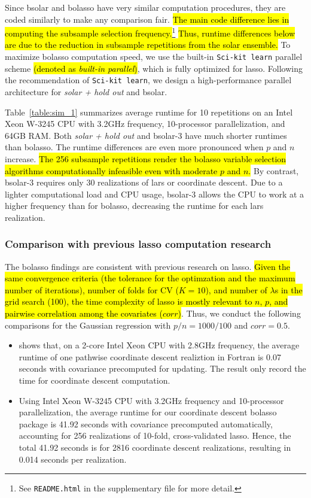\documentclass[11pt,review,authoryear]{elsarticle}
\begin{document}
Since bsolar and bolasso have very similar computation procedures, they are coded similarly to make any comparison fair. \hl{The main code difference lies in computing the subsample selection frequency.}\footnote{See \texttt{README.html} in the supplementary file for more detail.} \hl{Thus, runtime differences below are due to the reduction in subsample repetitions from the solar ensemble.} To maximize bolasso computation speed, we use the built-in \texttt{Sci-kit learn} parallel scheme \hl{(denoted as \emph{built-in parallel})}, which is fully optimized for lasso. Following the recommendation of \texttt{Sci-kit learn}, we design a high-performance parallel architecture for \emph{solar + hold out} and bsolar.

Table~\ref{table:sim_1} summarizes average runtime for 10 repetitions on an Intel Xeon W-3245 CPU with 3.2GHz frequency, 10-processor parallelization, and 64GB RAM. Both \emph{solar + hold out} and bsolar-3 have much shorter runtimes than bolasso. The runtime differences are even more pronounced when $p$ and $n$ increase. \hl{The 256 subsample repetitions render the bolasso variable selection algorithms computationally infeasible even with moderate $p$ and $n$.} By contrast, bsolar-3 requires only 30 realizations of lars or coordinate descent. Due to a lighter computational load and CPU usage, bsolar-3 allows the CPU to work at a higher frequency than for bolasso, decreasing the runtime for each lars realization.

\subsubsection{Comparison with previous lasso computation research}

The bolasso findings are consistent with previous research on lasso. \hl{Given the same  convergence criteria (the tolerance for the optimzation and the maximum number of iterations), number of folds for CV ($K=10$), and number of $\lambda$s in the grid search (100), the time complexity of lasso is mostly relevant to $n$, $p$, and pairwise correlation among the covariates ($corr$)}. Thus, we conduct the following comparisons for the Gaussian regression with $p/n=1000/100$ and $corr=0.5$.

\begin{itemize}
  \item \citet[Table 1]{friedman2010regularization} shows that, on a 2-core Intel Xeon CPU with 2.8GHz frequency, the average runtime of one pathwise coordinate descent realiztion in Fortran is 0.07 seconds with covariance precomputed for updating. The \citet{friedman2010regularization} result only record the time for coordinate descent computation.
  \item Using Intel Xeon W-3245 CPU with 3.2GHz frequency and 10-processor parallelization, the average runtime for our coordinate descent bolasso package is 41.92 seconds with covariance precomputed automatically, accounting for 256 realizations of 10-fold, cross-validated lasso. Hence, the total 41.92 seconds is for 2816 coordinate descent realizations, resulting in 0.014 seconds per realization. 
\end{itemize}
\end{document}
